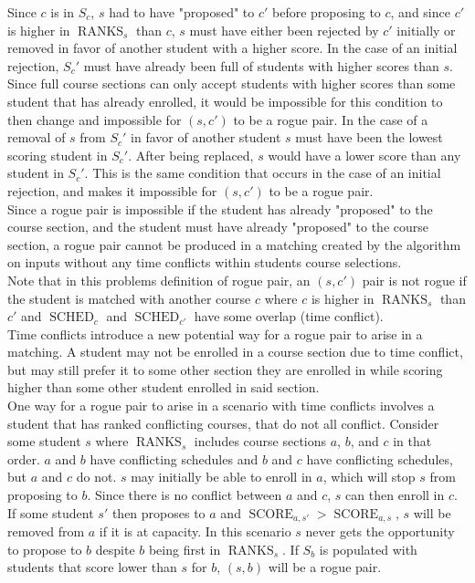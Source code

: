 \documentclass{article}
\newcommand{\sched}{\operatorname{SCHED}}
\newcommand{\ranks}{\operatorname{RANKS}}
\newcommand{\score}{\operatorname{SCORE}}
\begin{document}
Since $c$ is in $S_c$, $s$ had to have "proposed" to $c'$ before proposing to $c$, and since $c'$ is higher in $\ranks_s$ than $c$, $s$ must have either been rejected by $c'$ initially or removed in favor of another student with a higher score. In the case of an initial rejection, $S_c'$ must have already been full of students with higher scores than $s$. Since full course sections can only accept students with higher scores than some student that has already enrolled, it would be impossible for this condition to then change and impossible for $(s, c')$ to be a rogue pair. In the case of a removal of $s$ from $S_c'$ in favor of another student $s$ must have been the lowest scoring student in $S_c'$. After being replaced, $s$ would have a lower score than any student in $S_c'$. This is the same condition that occurs in the case of an initial rejection, and makes it impossible for $(s, c')$ to be a rogue pair.\\

Since a rogue pair is impossible if the student has already "proposed" to the course section, and the student must have already "proposed" to the course section, a rogue pair cannot be produced in a matching created by the algorithm on inputs without any time conflicts within students course selections.\\

Note that in this problems definition of rogue pair, an $(s, c')$ pair is not rogue if the student is matched with another course $c$ where $c$ is higher in $\ranks_s$ than $c'$ and $\sched_c$ and $\sched_{c'}$ have some overlap (time conflict).\\

Time conflicts introduce a new potential way for a rogue pair to arise in a matching. A student may not be enrolled in a course section due to time conflict, but may still prefer it to some other section they are enrolled in while scoring higher than some other student enrolled in said section.\\

One way for a rogue pair to arise in a scenario with time conflicts involves a student that has ranked conflicting courses, that do not all conflict. Consider some student $s$ where $\ranks_s$ includes course sections $a$, $b$, and $c$ in that order. $a$ and $b$ have conflicting schedules and $b$ and $c$ have conflicting schedules, but $a$ and $c$ do not. $s$ may initially be able to enroll in $a$, which will stop $s$ from proposing to $b$. Since there is no conflict between $a$ and $c$, $s$ can then enroll in $c$. If some student $s'$ then proposes to $a$ and $\score_{a,s'} > \score_{a,s}$, $s$ will be removed from $a$ if it is at capacity. In this scenario $s$ never gets the opportunity to propose to $b$ despite $b$ being first in $\ranks_s$. If $S_b$ is populated with students that score lower than $s$ for $b$, $(s, b)$ will be a rogue pair. \\
\end{document}
